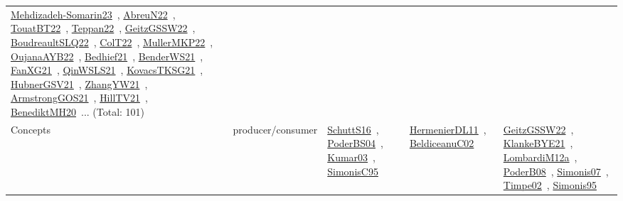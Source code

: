 {\begin{longtable}{lp{3cm}>{\raggedright\arraybackslash}p{6cm}>{\raggedright\arraybackslash}p{6cm}>{\raggedright\arraybackslash}p{8cm}}
\href{papers/Mehdizadeh-Somarin23.pdf}{Mehdizadeh-Somarin23}~\cite{Mehdizadeh-Somarin23}, \href{articles/AbreuN22.pdf}{AbreuN22}~\cite{AbreuN22}, \href{papers/TouatBT22.pdf}{TouatBT22}~\cite{TouatBT22}, \href{papers/Teppan22.pdf}{Teppan22}~\cite{Teppan22}, \href{papers/GeitzGSSW22.pdf}{GeitzGSSW22}~\cite{GeitzGSSW22}, \href{papers/BoudreaultSLQ22.pdf}{BoudreaultSLQ22}~\cite{BoudreaultSLQ22}, \href{articles/ColT22.pdf}{ColT22}~\cite{ColT22}, \href{articles/MullerMKP22.pdf}{MullerMKP22}~\cite{MullerMKP22}, \href{papers/OujanaAYB22.pdf}{OujanaAYB22}~\cite{OujanaAYB22}, \href{articles/Bedhief21.pdf}{Bedhief21}~\cite{Bedhief21}, \href{papers/BenderWS21.pdf}{BenderWS21}~\cite{BenderWS21}, \href{articles/FanXG21.pdf}{FanXG21}~\cite{FanXG21}, \href{articles/QinWSLS21.pdf}{QinWSLS21}~\cite{QinWSLS21}, \href{papers/KovacsTKSG21.pdf}{KovacsTKSG21}~\cite{KovacsTKSG21}, \href{articles/HubnerGSV21.pdf}{HubnerGSV21}~\cite{HubnerGSV21}, \href{articles/ZhangYW21.pdf}{ZhangYW21}~\cite{ZhangYW21}, \href{papers/ArmstrongGOS21.pdf}{ArmstrongGOS21}~\cite{ArmstrongGOS21}, \href{papers/HillTV21.pdf}{HillTV21}~\cite{HillTV21}, \href{articles/BenediktMH20.pdf}{BenediktMH20}~\cite{BenediktMH20}... (Total: 101)\\
Concepts & producer/consumer & \href{papers/SchuttS16.pdf}{SchuttS16}~\cite{SchuttS16}, \href{articles/PoderBS04.pdf}{PoderBS04}~\cite{PoderBS04}, \href{papers/Kumar03.pdf}{Kumar03}~\cite{Kumar03}, \href{papers/SimonisC95.pdf}{SimonisC95}~\cite{SimonisC95} & \href{papers/HermenierDL11.pdf}{HermenierDL11}~\cite{HermenierDL11}, \href{papers/BeldiceanuC02.pdf}{BeldiceanuC02}~\cite{BeldiceanuC02} & \href{papers/GeitzGSSW22.pdf}{GeitzGSSW22}~\cite{GeitzGSSW22}, \href{papers/KlankeBYE21.pdf}{KlankeBYE21}~\cite{KlankeBYE21}, \href{articles/LombardiM12a.pdf}{LombardiM12a}~\cite{LombardiM12a}, \href{papers/PoderB08.pdf}{PoderB08}~\cite{PoderB08}, \href{articles/Simonis07.pdf}{Simonis07}~\cite{Simonis07}, \href{articles/Timpe02.pdf}{Timpe02}~\cite{Timpe02}, \href{papers/Simonis95.pdf}{Simonis95}~\cite{Simonis95}\\

\end{longtable}}
